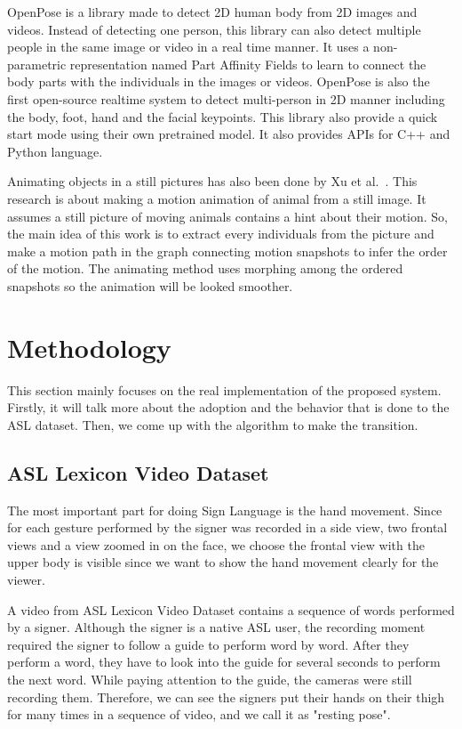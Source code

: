 \documentclass{sig-alternate-05-2015}
\begin{document}
OpenPose is a library made to detect 2D human body from 2D images and videos. Instead of detecting one person, this library can also detect multiple people in the same image or video in a real time manner. It uses a non-parametric representation named Part Affinity Fields to learn to connect the body parts with the individuals in the images or videos. OpenPose is also the first open-source realtime system to detect multi-person in 2D manner including the body, foot, hand and the facial keypoints. This library also provide a quick start mode using their own pretrained model. It also provides APIs for C++ and Python language.

Animating objects in a still pictures has also been done by Xu et al.~\cite{AnimatingAnimalMotionFromStill}. This research is about making a motion animation of animal from a still image. It assumes a still picture of moving animals contains a hint about their motion. So, the main idea of this work is to extract every individuals from the picture and make a motion path in the graph connecting motion snapshots to infer the order of the motion. The animating method uses morphing among the ordered snapshots so the animation will be looked smoother.

\section{Methodology}
This section mainly focuses on the real implementation of the proposed system. Firstly, it will talk more about the adoption and the behavior that is done to the ASL dataset. Then, we come up with the algorithm to make the transition.

\subsection{ASL Lexicon Video Dataset}
The most important part for doing Sign Language is the hand movement. Since for each gesture performed by the signer was recorded in a side view, two frontal views and a view zoomed in on the face, we choose the frontal view with the upper body is visible since we want to show the hand movement clearly for the viewer.

A video from ASL Lexicon Video Dataset contains a sequence of words performed by a signer. Although the signer is a native ASL user, the recording moment required the signer to follow a guide to perform word by word. After they perform a word, they have to look into the guide for several seconds to perform the next word. While paying attention to the guide, the cameras were still recording them. Therefore, we can see the signers put their hands on their thigh for many times in a sequence of video, and we call it as "resting pose".
\end{document}
